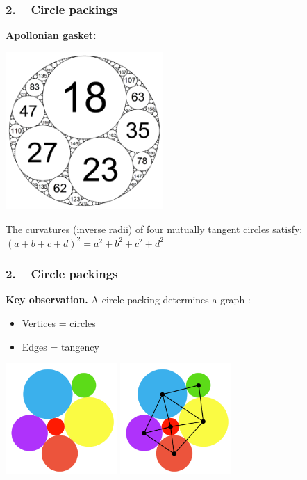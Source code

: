 \begin{frame}
\frametitle{2. ~ Circle packings}



{\bfseries Apollonian gasket:}

\begin{center}
\includegraphics[width=170pt]{ApollonianGasket.png}
\end{center}

The curvatures (inverse radii) of four mutually tangent circles satisfy:
$(a + b + c + d)^2 = a^2 + b^2 + c^2 + d^2 $

\end{frame}



\begin{frame}
\frametitle{2. ~ Circle packings}



{\bfseries Key observation.} A circle packing determines a graph :
\begin{itemize}[$\bullet$]
 \item Vertices = circles
 \item Edges = tangency
\end{itemize}

\bigskip \pause

\begin{center}
\includegraphics[width=120pt]{CP8b.png} \hspace{20pt}
\includegraphics[width=120pt]{CP8c.pdf}
\end{center}

\end{frame}



